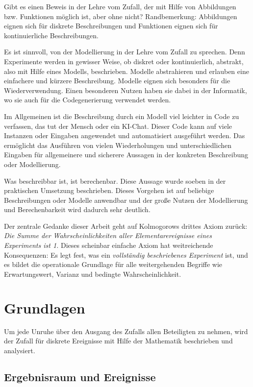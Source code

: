 ﻿\documentclass[12pt,a4paper]{article}
\theoremstyle{definition}
\theoremstyle{plain}
\theoremstyle{remark}
\begin{document}
Gibt es einen Beweis in der Lehre vom Zufall, der mit Hilfe von Abbildungen bzw. Funktionen möglich ist, aber ohne nicht? Randbemerkung: Abbildungen eignen sich für diskrete Beschreibungen und Funktionen eignen sich für kontinuierliche Beschreibungen. 

Es ist sinnvoll, von der Modellierung in der Lehre vom Zufall zu sprechen. Denn Experimente werden in gewisser Weise, ob diskret oder kontinuierlich, abstrakt, also mit Hilfe eines Modells, beschrieben. Modelle abstrahieren und erlauben eine einfachere und kürzere Beschreibung. Modelle eignen sich besonders für die Wiederverwendung. Einen besonderen Nutzen haben sie dabei in der Informatik, wo sie auch für die Codegenerierung verwendet werden. 

Im Allgemeinen ist die Beschreibung durch ein Modell viel leichter in Code zu verfassen, das tut der Mensch oder ein KI-Chat. Dieser Code kann auf viele Instanzen oder Eingaben angewendet und automatisiert ausgeführt werden. Das ermöglicht das Ausführen von vielen Wiederholungen und unterschiedlichen Eingaben für allgemeinere und sicherere Aussagen in der konkreten Beschreibung oder Modellierung.

Was beschreibbar ist, ist berechenbar. Diese Aussage wurde soeben in der praktischen Umsetzung beschrieben. Dieses Vorgehen ist auf beliebige Beschreibungen oder Modelle anwendbar und der große Nutzen der Modellierung und Berechenbarkeit wird dadurch sehr deutlich.

Der zentrale Gedanke dieser Arbeit geht auf Kolmogorows drittes Axiom
zurück: \emph{Die Summe der Wahrscheinlichkeiten aller Elementarereignisse
eines Experiments ist 1.} Dieses scheinbar einfache Axiom hat weitreichende
Konsequenzen: Es legt fest, was ein \emph{vollständig beschriebenes Experiment}
ist, und es bildet die operationale Grundlage für alle weitergehenden Begriffe
wie Erwartungswert, Varianz und bedingte Wahrscheinlichkeit.

\section{Grundlagen}
\label{sec:grundlagen}

Um jede Unruhe über den Ausgang des Zufalls allen Beteiligten zu nehmen, wird
der Zufall für diskrete Ereignisse mit Hilfe der Mathematik beschrieben und
analysiert.

\subsection{Ergebnisraum und Ereignisse}
\end{document}
